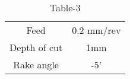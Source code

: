 \begin{table}[H]
    \centering
    \begin{tabular}{c|c}
       Feed  & 0.2 mm/rev \\
       Depth of cut & 1mm\\
       Rake angle & -5'\\
    \end{tabular}
    \caption{Table-3}
    \label{tab:tables/table3.tex}
\end{table}